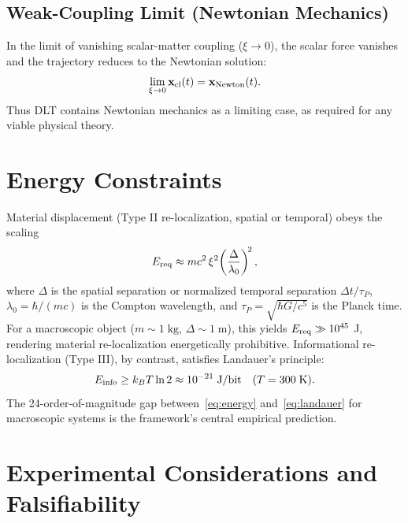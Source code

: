 \documentclass[conference,letterpaper,10pt]{IEEEtran}
\begin{document}
\subsection{Weak-Coupling Limit (Newtonian Mechanics)}
In the limit of vanishing scalar-matter coupling (\(\xi \to 0\)), the scalar force vanishes and the trajectory reduces
to the Newtonian solution:
\begin{equation}
\lim_{\xi\to0}\mathbf{x}_{\rm cl}(t) = \mathbf{x}_{\rm Newton}(t).
\label{eq:newton}
\end{equation}
Thus DLT contains Newtonian mechanics as a limiting case, as required for any viable physical theory.

\section{Energy Constraints}
Material displacement (Type II re-localization, spatial or temporal) obeys the scaling
\begin{equation}
E_{\rm req} \approx mc^2\,\xi^2\!\left(\frac{\Delta}{\lambda_0}\right)^{\!2},
\label{eq:energy}
\end{equation}
where \(\Delta\) is the spatial separation or normalized temporal separation \(\Delta t/\tau_P\), \(\lambda_0 = \hbar/(mc)\)
 is the Compton wavelength, and \(\tau_P = \sqrt{\hbar G/c^5}\) is the Planck time. For a macroscopic object (\(m \sim
1\;\text{kg}\), \(\Delta \sim 1\;\text{m}\)), this yields \(E_{\rm req} \gg 10^{45}\) J, rendering material re-localization
 energetically prohibitive.
Informational re-localization (Type III), by contrast, satisfies Landauer's principle:
\begin{equation}
E_{\rm info} \ge k_B T\ln 2 \approx 10^{-21}\;\text{J/bit}\quad (T = 300\;\text{K}).
\label{eq:landauer}
\end{equation}
The 24-order-of-magnitude gap between~\eqref{eq:energy} and~\eqref{eq:landauer} for macroscopic systems is the
framework's central empirical prediction.

\section{Experimental Considerations and Falsifiability}
\end{document}
